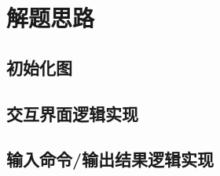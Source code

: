 \section{解题思路}   

    \subsection{初始化图}
        

\newpage

    \subsection{交互界面逻辑实现}
        
    
\newpage
    
    \subsection{输入命令/输出结果逻辑实现}
        